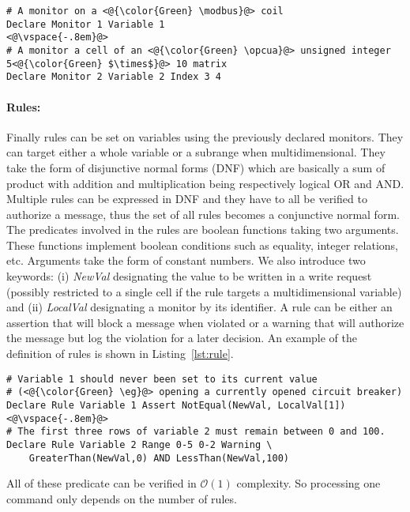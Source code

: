 \begin{lstlisting}[label=lst:mon,caption=Monitor definition example]
# A monitor on a <@{\color{Green} \modbus}@> coil
Declare Monitor 1 Variable 1
<@\vspace{-.8em}@>
# A monitor a cell of an <@{\color{Green} \opcua}@> unsigned integer 5<@{\color{Green} $\times$}@> 10 matrix
Declare Monitor 2 Variable 2 Index 3 4
\end{lstlisting}

\paragraph{Rules:} Finally rules can be set on variables using the previously
declared monitors.
They can target either a whole variable or a subrange when multidimensional.
They take the form of disjunctive normal forms (DNF) which are basically a sum of
product with addition and multiplication being respectively logical OR and AND.
Multiple rules can be expressed in DNF and they have to all be verified to 
authorize a message, thus the set of all rules becomes a conjunctive normal
form.
The predicates involved in the rules are boolean functions taking two arguments.
These functions implement boolean conditions such as equality, integer
relations, etc.
Arguments take the form of constant numbers.
We also introduce two keywords: (i) {\em NewVal} designating the value to be
written in a write request (possibly restricted to a single cell if the rule
targets a multidimensional variable) and (ii) {\em LocalVal} designating a
monitor by its identifier.
A rule can be either an assertion that will block a message when violated or a
warning that will authorize the message but log the violation for a later
decision.
An example of the definition of rules is shown in Listing~\ref{lst:rule}.

\begin{lstlisting}[label=lst:rule,caption=Rule definition example]
# Variable 1 should never been set to its current value
# (<@{\color{Green} \eg}@> opening a currently opened circuit breaker)
Declare Rule Variable 1 Assert NotEqual(NewVal, LocalVal[1])
<@\vspace{-.8em}@>
# The first three rows of variable 2 must remain between 0 and 100.
Declare Rule Variable 2 Range 0-5 0-2 Warning \
    GreaterThan(NewVal,0) AND LessThan(NewVal,100)
\end{lstlisting}

All of these predicate can be verified in $\mathcal{O}(1)$ complexity.
So processing one command only depends on the number of rules.
